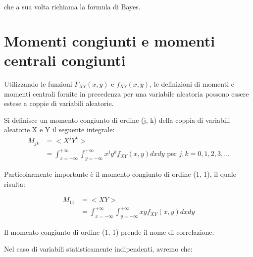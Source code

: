che a sua volta richiama la formula di Bayes. \newline 

\newpage

\section{Momenti congiunti e momenti centrali congiunti} 

Utilizzando le funzioni $F_{XY} (x, y)$ e $f_{XY} (x, y)$, le definizioni di momenti e momenti centrali fornite in precedenza per una variabile 
aleatoria possono essere estese a coppie di variabili aleatorie. \newline 

Si definisce un momento congiunto di ordine (j, k) della coppia di variabili aleatorie X e Y il seguente integrale: 
{
    \Large 
    \begin{equation}
        \begin{split}
            M_{j k} 
            &= 
            <X^{j} Y^{k}>
            \\ 
            &= 
            \int_{x = -\infty}^{+ \infty}
            \int_{y = -\infty}^{+ \infty}
            x^{j} y^{k} 
            f_{XY} (x, y) 
            dx 
            dy 
            \text{ per } 
            j,k = 0, 1, 2, 3, ...
        \end{split}
    \end{equation}
} 

Particolarmente importante è il momento congiunto di ordine (1, 1), il quale risulta: 

{
    \Large 
    \begin{equation}
        \begin{split}
            M_{1 1} 
            &= 
            <X Y>
            \\ 
            &= 
            \int_{x = -\infty}^{+ \infty}
            \int_{y = -\infty}^{+ \infty}
            x y 
            f_{XY} (x, y) 
            dx 
            dy 
        \end{split}
    \end{equation}
}

Il momento congiunto di ordine (1, 1) prende il nome di correlazione. \newline 

Nel caso di variabili statisticamente indipendenti, avremo che: 

